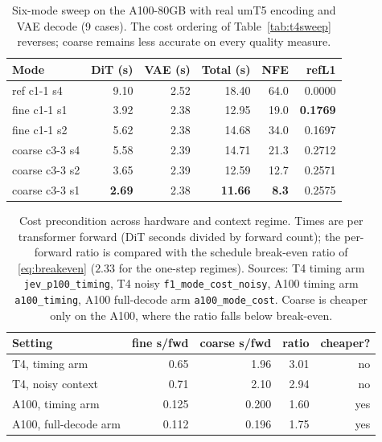 \documentclass[journal]{IEEEtran}
\newcommand{\cfine}{\textup{c1-1}}
\newcommand{\ccoarse}{\textup{c3-3}}
\begin{document}
\begin{table}[!t]
\centering
\caption{Six-mode sweep on the A100-80GB with real umT5 encoding and VAE decode (9 cases). The cost ordering of Table~\ref{tab:t4sweep} reverses; coarse remains less accurate on every quality measure.}
\label{tab:a100sweep}
\renewcommand{\arraystretch}{1.12}
\footnotesize
\setlength{\tabcolsep}{3pt}
\begin{tabular}{@{}lrrrrr@{}}
\toprule
Mode & DiT (s) & VAE (s) & Total (s) & NFE & refL1 \\
\midrule
ref \cfine{} s4   & 9.10 & 2.52 & 18.40 & 64.0 & 0.0000 \\
fine \cfine{} s1  & 3.92 & 2.38 & 12.95 & 19.0 & \textbf{0.1769} \\
fine \cfine{} s2  & 5.62 & 2.38 & 14.68 & 34.0 & 0.1697 \\
coarse \ccoarse{} s4 & 5.58 & 2.39 & 14.71 & 21.3 & 0.2712 \\
coarse \ccoarse{} s2 & 3.65 & 2.39 & 12.59 & 12.7 & 0.2571 \\
coarse \ccoarse{} s1 & \textbf{2.69} & 2.38 & \textbf{11.66} & \textbf{8.3} & 0.2575 \\
\bottomrule
\end{tabular}
\end{table}

\begin{table}[!t]
\centering
\caption{Cost precondition across hardware and context regime. Times are per transformer forward (DiT seconds divided by forward count); the per-forward ratio is compared with the schedule break-even ratio of \eqref{eq:breakeven} ($2.33$ for the one-step regimes). Sources: T4 timing arm \texttt{jev\_p100\_timing}, T4 noisy \texttt{f1\_mode\_cost\_noisy}, A100 timing arm \texttt{a100\_timing}, A100 full-decode arm \texttt{a100\_mode\_cost}. Coarse is cheaper only on the A100, where the ratio falls below break-even.}
\label{tab:costpre}
\renewcommand{\arraystretch}{1.12}
\footnotesize
\setlength{\tabcolsep}{4pt}
\begin{tabular}{@{}lrrrr@{}}
\toprule
Setting & fine s/fwd & coarse s/fwd & ratio & cheaper? \\
\midrule
T4, timing arm         & 0.65  & 1.96  & 3.01 & no \\
T4, noisy context      & 0.71  & 2.10  & 2.94 & no \\
A100, timing arm       & 0.125 & 0.200 & 1.60 & yes \\
A100, full-decode arm  & 0.112 & 0.196 & 1.75 & yes \\
\bottomrule
\end{tabular}
\end{table}
\end{document}

